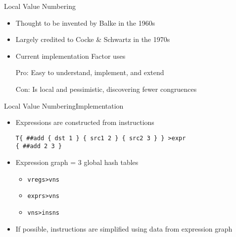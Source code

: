 \documentclass{beamer}
\begin{document}
\begin{frame}{Local Value Numbering}
  \begin{itemize}
    \item Thought to be invented by Balke in the 1960s
    \item Largely credited to Cocke \& Schwartz in the 1970s
    \item Current implementation Factor uses
  \end{itemize}

  \begin{itemize}
    \item[Pro:] Easy to understand, implement, and extend

    \item[Con:] Is \alert{local} and \alert{pessimistic}, discovering fewer
    congruences
  \end{itemize}
\end{frame}

\begin{frame}[fragile]{Local Value Numbering}{Implementation}
  \begin{itemize}
    \item \alert{Expressions} are constructed from instructions
    \begin{example}
      \begin{Verbatim}
T{ ##add { dst 1 } { src1 2 } { src2 3 } } >expr
{ ##add 2 3 }
      \end{Verbatim}
    \end{example}

    \item \alert{Expression graph} = 3 global hash tables
    \begin{itemize}
      \item \texttt{vregs>vns}
      \item \texttt{exprs>vns}
      \item \texttt{vns>insns}
    \end{itemize}

    \item If possible, instructions are simplified using data from expression
    graph
  \end{itemize}
\end{frame}
\end{document}
